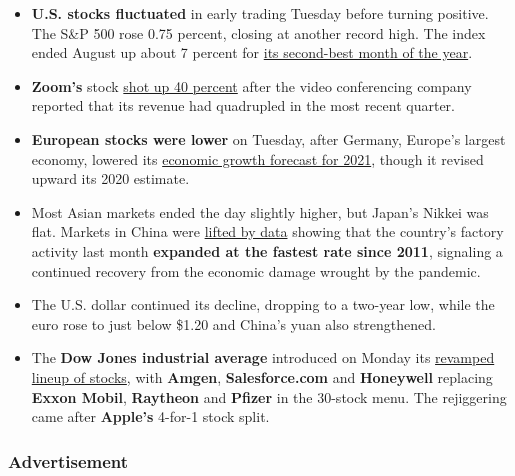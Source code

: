 \begin{itemize}
\item
  \textbf{U.S. stocks fluctuated} in early trading Tuesday before
  turning positive. The S\&P 500 rose 0.75 percent, closing at another
  record high. The index ended August up about 7 percent for
  \href{https://www.nytimes3xbfgragh.onion/live/2020/08/31/business/stock-market-today-coronavirus/the-sp-ended-its-run-of-gains-but-had-its-second-best-month-this-year}{its
  second-best month of the year}.
\item
  \textbf{Zoom's} stock
  \href{https://www.nytimes3xbfgragh.onion/live/2020/09/01/business/stock-market-today-coronavirus/zoom-shares-are-soaring}{shot
  up 40 percent} after the video conferencing company reported that its
  revenue had quadrupled in the most recent quarter.
\item
  \textbf{European stocks were lower} on Tuesday, after Germany,
  Europe's largest economy, lowered its
  \href{https://www.nytimes3xbfgragh.onion/reuters/2020/09/01/world/europe/01reuters-health-coronavirus-germany-economy.html}{economic
  growth forecast for 2021}, though it revised upward its 2020 estimate.
\item
  Most Asian markets ended the day slightly higher, but Japan's Nikkei
  was flat. Markets in China were
  \href{https://www.reuters.com/article/us-china-economy-pmi/chinas-august-export-orders-shake-off-covid-gloom-fuelling-factory-expansion-caixin-pmi-idUSKBN25S3A7}{lifted
  by data} showing that the country's factory activity last month
  \textbf{expanded at the fastest rate since 2011}, signaling a
  continued recovery from the economic damage wrought by the pandemic.
\item
  The U.S. dollar continued its decline, dropping to a two-year low,
  while the euro rose to just below \$1.20 and China's yuan also
  strengthened.
\item
  The \textbf{Dow Jones industrial average} introduced on Monday its
  \href{https://www.nytimes3xbfgragh.onion/live/2020/08/31/business/stock-market-today-coronavirus/why-the-dow-revamped-its-lineup-of-stocks}{revamped
  lineup of stocks}, with \textbf{Amgen}, \textbf{Salesforce.com} and
  \textbf{Honeywell} replacing \textbf{Exxon Mobil}, \textbf{Raytheon}
  and \textbf{Pfizer} in the 30-stock menu. The rejiggering came after
  \textbf{Apple's} 4-for-1 stock split.
\end{itemize}

\hypertarget{advertisement-1}{%
\subsubsection{Advertisement}\label{advertisement-1}}

